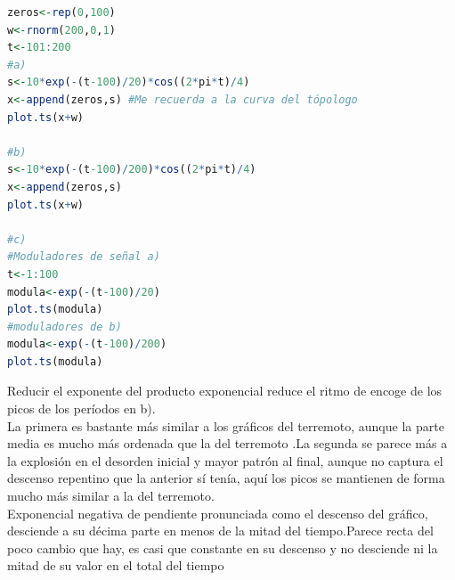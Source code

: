 \documentclass[11pt,a4paper,oneside]{report}
\theoremstyle{definition}
\theoremstyle{plain}
\theoremstyle{remark}
\begin{document}
\begin{lstlisting}[language=R, caption={Solución}]
zeros<-rep(0,100)
w<-rnorm(200,0,1)
t<-101:200
#a)
s<-10*exp(-(t-100)/20)*cos((2*pi*t)/4)
x<-append(zeros,s) #Me recuerda a la curva del tópologo
plot.ts(x+w)

#b)
s<-10*exp(-(t-100)/200)*cos((2*pi*t)/4)
x<-append(zeros,s) 
plot.ts(x+w)

#c)
#Moduladores de señal a)
t<-1:100
modula<-exp(-(t-100)/20)
plot.ts(modula) 
#moduladores de b)
modula<-exp(-(t-100)/200)
plot.ts(modula)


\end{lstlisting}
Reducir el exponente del producto exponencial reduce el ritmo de encoge de los picos de los períodos en b). \\
La primera es bastante más similar a los gráficos del terremoto, aunque la parte media es mucho más
ordenada que la del terremoto .La segunda se parece más a la explosión en el desorden inicial y mayor 
patrón al final, aunque no captura el descenso repentino que la anterior sí tenía, aquí los picos
se mantienen de forma mucho más similar a la del terremoto.\\
Exponencial negativa de pendiente pronunciada como el descenso del gráfico, 
desciende a su décima parte en menos de la mitad del tiempo.Parece recta del poco cambio que hay, 
es casi que constante en su descenso y no desciende ni la mitad de su valor en el total del tiempo

\printindex
\end{document}
